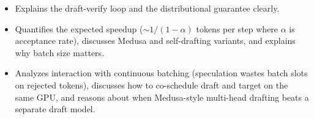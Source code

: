 \begin{interviewq}
\goodgreat
\begin{itemize}
    \item {} Explains the draft-verify loop and the distributional guarantee clearly.
    \item {} Quantifies the expected speedup ($\sim 1/(1-\alpha)$ tokens per step where $\alpha$ is acceptance rate), discusses Medusa and self-drafting variants, and explains why batch size matters.
    \item {} Analyzes interaction with continuous batching (speculation wastes batch slots on rejected tokens), discusses how to co-schedule draft and target on the same GPU, and reasons about when Medusa-style multi-head drafting beats a separate draft model.
\end{itemize}

\end{interviewq}


